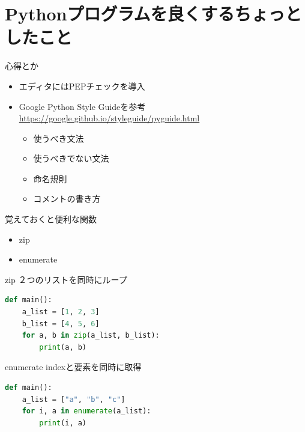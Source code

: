 \documentclass[12pt, dvipdfmx]{beamer}
\begin{document}
\section{Pythonプログラムを良くするちょっとしたこと}
\begin{frame}{心得とか}
    \begin{itemize}
        \item エディタにはPEPチェックを導入
        \item Google Python Style Guideを参考\\
            {\small\url{https://google.github.io/styleguide/pyguide.html}}
        \begin{itemize}
            \item 使うべき文法
            \item 使うべきでない文法
            \item 命名規則
            \item コメントの書き方
        \end{itemize}
    \end{itemize}
\end{frame}
\begin{frame}{覚えておくと便利な関数}
    \begin{itemize}
        \item zip
        \item enumerate
    \end{itemize}
\end{frame}
\begin{frame}[fragile]{zip}
    ２つのリストを同時にループ
\begin{lstlisting}[language=Python,basicstyle=\ttfamily, keywordstyle=\color{blue}\ttfamily, stringstyle=\color{red}, caption={zip\_sample.py},captionpos=t]
def main():
    a_list = [1, 2, 3]
    b_list = [4, 5, 6]
    for a, b in zip(a_list, b_list):
        print(a, b)
\end{lstlisting}
\end{frame}
\begin{frame}[fragile]{enumerate}
    indexと要素を同時に取得
\begin{lstlisting}[language=Python,basicstyle=\ttfamily,keywordstyle=\color{blue}\ttfamily, stringstyle=\color{red},caption={enum\_sample.py},captionpos=t]
def main():
    a_list = ["a", "b", "c"]
    for i, a in enumerate(a_list):
        print(i, a)
\end{lstlisting}
\end{frame}
\end{document}
